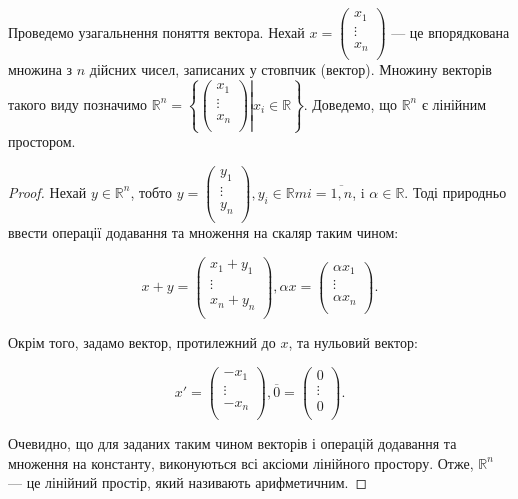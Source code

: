 \begin{example}
	Проведемо узагальнення поняття вектора. Нехай $x = \begin{pmatrix}
		x_1  \\
		\vdots  \\
		x_n  \\
	\end{pmatrix}$ --- це
	впорядкована множина з $n$ дійсних чисел, записаних у стовпчик (вектор).
	Множину векторів такого виду позначимо $\mathbb{R}^n = \left\{\left.\begin{pmatrix}
		x_1  \\
		\vdots  \\
		x_n  \\
	\end{pmatrix}\right| x_i \in \mathbb{R}\right\}$. Доведемо, що $\mathbb{R}^n$
	є лінійним простором.
\end{example}
\begin{proof}
	Нехай $y \in \mathbb{R}^n$, тобто $y = \begin{pmatrix}
		y_1  \\
		\vdots  \\
		y_n  \\
	\end{pmatrix}, y_i \in \mathbb{R}m i = \overline{1, n}$, i $\alpha \in \mathbb{R}$. Тоді
	природньо ввести операції додавання та множення на скаляр таким чином:
		
	 $$x + y = \begin{pmatrix}
		x_1 + y_1  \\
		\vdots  \\
		x_n + y_n  \\
	\end{pmatrix}, \alpha x = \begin{pmatrix}
		\alpha x_1  \\
		\vdots  \\
		\alpha x_n  \\
	\end{pmatrix}.$$
	
	Окрім того, задамо вектор, протилежний до $x$, та нульовий вектор:
	
	$$x' =\begin{pmatrix}
		-x_1  \\
		\vdots  \\
		-x_n  \\
	\end{pmatrix}, \overline{0} = \begin{pmatrix}
		0  \\
		\vdots  \\
		0  \\
	\end{pmatrix}.$$

	Очевидно, що для заданих таким чином векторів і операцій додавання та
	множення на константу, виконуються всі аксіоми лінійного простору. Отже, $\mathbb{R}^n$ ---
	це лінійний простір, який називають арифметичним. 
\end{proof}

